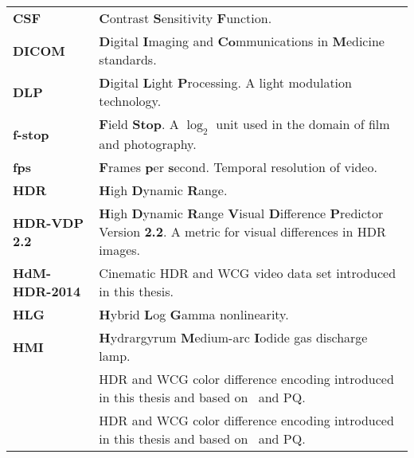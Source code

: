 \begin{flushleft}
\begin{longtable}[c]{@{}p{28.5mm}@{} p{120.5mm}}
	\textbf{CSF}	& \textbf{C}ontrast \textbf{S}ensitivity \textbf{F}unction.\\
	\textbf{DICOM}	& \textbf{D}igital \textbf{I}maging and \textbf{Co}mmunications in \textbf{M}edicine standards.\\
	\textbf{DLP}	& \textbf{D}igital \textbf{L}ight \textbf{P}rocessing. A light modulation technology.\\	
	\textbf{f-stop}	& \textbf{F}ield \textbf{Stop}. A $\log_2$ unit used in the domain of film and photography.\\
	\textbf{fps}	& \textbf{F}rames \textbf{p}er \textbf{s}econd. Temporal resolution of video.\\
	\textbf{HDR}	& \textbf{H}igh \textbf{D}ynamic \textbf{R}ange.\\ 
	\textbf{HDR-VDP 2.2}	& \textbf{H}igh \textbf{D}ynamic \textbf{R}ange \textbf{V}isual \textbf{D}ifference \textbf{P}redictor Version \textbf{2.2}. A metric for visual differences in HDR images.\\
	\textbf{HdM-HDR-2014}	& Cinematic HDR and WCG video data set introduced in this thesis.\\
	\textbf{HLG}	& \textbf{H}ybrid \textbf{L}og \textbf{G}amma nonlinearity.\\
	\textbf{HMI}	& \textbf{H}ydrargyrum \textbf{M}edium-arc \textbf{I}odide gas discharge lamp.\\
	\textbf{\ICaCb}	& HDR and WCG color difference encoding introduced in this thesis and based on \IPT\ and PQ.\\
	\textbf{\ICtCp}	& HDR and WCG color difference encoding introduced in this thesis and based on \IPT\ and PQ.\\

\end{longtable}
\end{flushleft}

